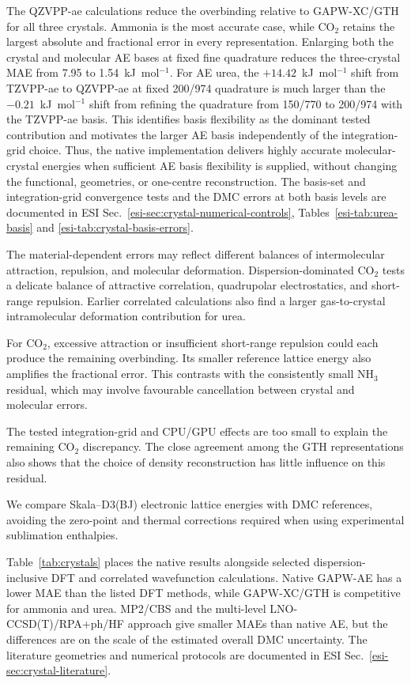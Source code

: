 \documentclass[10pt,a4paper,twocolumn]{article}
\begin{document}
The QZVPP-ae calculations reduce the overbinding relative to GAPW-XC/GTH for all three crystals. Ammonia is the most accurate case, while CO$_2$ retains the largest absolute and fractional error in every representation. Enlarging both the crystal and molecular AE bases at fixed fine quadrature reduces the three-crystal MAE from 7.95 to 1.54~kJ~mol$^{-1}$.  For AE urea, the $+14.42$~kJ~mol$^{-1}$ shift from TZVPP-ae to QZVPP-ae at fixed 200/974 quadrature is much larger than the $-0.21$~kJ~mol$^{-1}$ shift from refining the quadrature from 150/770 to 200/974 with the TZVPP-ae basis. This identifies basis flexibility as the dominant tested contribution and motivates the larger AE basis independently of the integration-grid choice. Thus, the native implementation delivers highly accurate molecular-crystal energies when sufficient AE basis flexibility is supplied, without changing the functional, geometries, or one-centre reconstruction. The basis-set and integration-grid convergence tests and the DMC errors at both basis levels are documented in ESI Sec.~\ref{esi-sec:crystal-numerical-controls}, Tables~\ref{esi-tab:urea-basis} and \ref{esi-tab:crystal-basis-errors}.


The material-dependent errors may reflect different balances of intermolecular attraction, repulsion, and molecular deformation. Dispersion-dominated CO$_2$ tests a delicate balance of attractive correlation, quadrupolar electrostatics, and short-range repulsion. Earlier correlated calculations also find a larger gas-to-crystal intramolecular deformation contribution for urea.\cite{Sharkas2014Crystals}

For CO$_2$, excessive attraction or insufficient short-range repulsion could each produce the remaining overbinding. Its smaller reference lattice energy also amplifies the fractional error.  This contrasts with the consistently small NH$_3$ residual, which may involve favourable cancellation between crystal and molecular errors.

The tested integration-grid and CPU/GPU effects are too small to explain the remaining CO$_2$ discrepancy. The close agreement among the GTH representations also shows that the choice of density reconstruction has little influence on this residual.

We compare Skala--D3(BJ) electronic lattice energies with DMC references, avoiding the zero-point and thermal corrections required when using experimental sublimation enthalpies.\cite{DellaPia2024X23,Dolgonos2019X23b}


Table~\ref{tab:crystals} places the native results alongside selected dispersion-inclusive DFT and correlated wavefunction calculations. Native GAPW-AE has a lower MAE than the listed DFT methods, while GAPW-XC/GTH is competitive for ammonia and urea. MP2/CBS and the multi-level LNO-CCSD(T)/RPA+ph/HF approach give smaller MAEs than native AE, but the differences are on the scale of the estimated overall DMC uncertainty.\cite{DellaPia2024X23} The literature geometries and numerical protocols are documented in ESI Sec.~\ref{esi-sec:crystal-literature}.
\end{document}
